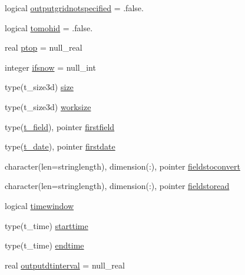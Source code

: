 \begin{DoxyCompactItemize}
\item 
logical \mbox{\hyperlink{structmodulewrfformat_1_1t__wrfformat_a4fdcdd7203d29acf125566671ce0e696}{outputgridnotspecified}} = .false.
\item 
logical \mbox{\hyperlink{structmodulewrfformat_1_1t__wrfformat_adf8e97b14565acfe24a927afc0ada7b7}{tomohid}} = .false.
\item 
real \mbox{\hyperlink{structmodulewrfformat_1_1t__wrfformat_a87bf1e317ea2b292dc17d8f02b7d1f03}{ptop}} = null\+\_\+real
\item 
integer \mbox{\hyperlink{structmodulewrfformat_1_1t__wrfformat_ab8af7f8e21919e433f2d0f9b044b7c21}{ifsnow}} = null\+\_\+int
\item 
type(t\+\_\+size3d) \mbox{\hyperlink{structmodulewrfformat_1_1t__wrfformat_adb66189a22884c234112ab45d32cdb22}{size}}
\item 
type(t\+\_\+size3d) \mbox{\hyperlink{structmodulewrfformat_1_1t__wrfformat_a2e83c39278f7c0d552ca3e6e98acc0da}{worksize}}
\item 
type(\mbox{\hyperlink{structmodulewrfformat_1_1t__field}{t\+\_\+field}}), pointer \mbox{\hyperlink{structmodulewrfformat_1_1t__wrfformat_a44a4c6e82fcf5e55ec49fd8bce010e82}{firstfield}}
\item 
type(\mbox{\hyperlink{structmodulewrfformat_1_1t__date}{t\+\_\+date}}), pointer \mbox{\hyperlink{structmodulewrfformat_1_1t__wrfformat_a596fc4859716a79edec1400eaded95fe}{firstdate}}
\item 
character(len=stringlength), dimension(\+:), pointer \mbox{\hyperlink{structmodulewrfformat_1_1t__wrfformat_af6cb888ab552d4d61e86336365b43091}{fieldstoconvert}}
\item 
character(len=stringlength), dimension(\+:), pointer \mbox{\hyperlink{structmodulewrfformat_1_1t__wrfformat_a1aac6a3b871c4fd2b4e0687eba05d5b8}{fieldstoread}}
\item 
logical \mbox{\hyperlink{structmodulewrfformat_1_1t__wrfformat_a720d5cd03eac4e26f3504a41b5beafdd}{timewindow}}
\item 
type(t\+\_\+time) \mbox{\hyperlink{structmodulewrfformat_1_1t__wrfformat_a48b389846d2a3993023869554611b383}{starttime}}
\item 
type(t\+\_\+time) \mbox{\hyperlink{structmodulewrfformat_1_1t__wrfformat_ada77443b0f37a9523d119712d815e95d}{endtime}}
\item 
real \mbox{\hyperlink{structmodulewrfformat_1_1t__wrfformat_ac4c434c2503c3d63d0355b6408b770a3}{outputdtinterval}} = null\+\_\+real
\item 

\end{DoxyCompactItemize}
